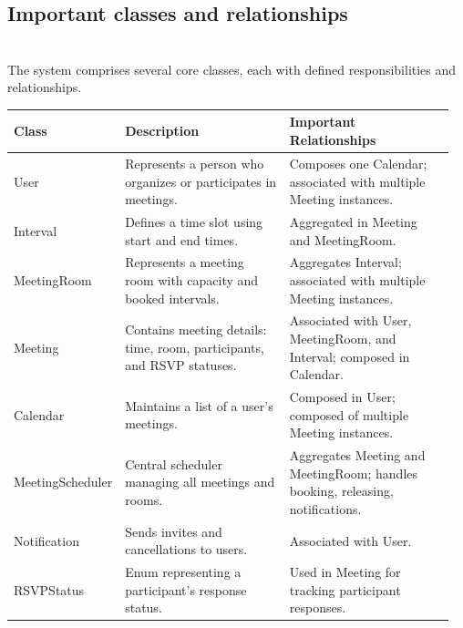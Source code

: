 \subsection{Important classes and relationships}\label{MwHfrjvXR7RgppNieLRdq}
\\
The system comprises several core classes, each with defined responsibilities and relationships.

\begin{center}
\begin{tabular}{|p{0.20\linewidth}|p{0.38\linewidth}|p{0.38\linewidth}|}
\hline
\textbf{Class} & \textbf{Description} & \textbf{Important Relationships} \\
\hline

User &
Represents a person who organizes or participates in meetings. &
Composes one Calendar; associated with multiple Meeting instances. \\
\hline

Interval &
Defines a time slot using start and end times. &
Aggregated in Meeting and MeetingRoom. \\
\hline

MeetingRoom &
Represents a meeting room with capacity and booked intervals. &
Aggregates Interval; associated with multiple Meeting instances. \\
\hline

Meeting &
Contains meeting details: time, room, participants, and RSVP statuses. &
Associated with User, MeetingRoom, and Interval; composed in Calendar. \\
\hline

Calendar &
Maintains a list of a user’s meetings. &
Composed in User; composed of multiple Meeting instances. \\
\hline

MeetingScheduler &
Central scheduler managing all meetings and rooms. &
Aggregates Meeting and MeetingRoom; handles booking, releasing, notifications. \\
\hline

Notification &
Sends invites and cancellations to users. &
Associated with User. \\
\hline

RSVPStatus &
Enum representing a participant’s response status. &
Used in Meeting for tracking participant responses. \\
\hline

\end{tabular}
\end{center}

